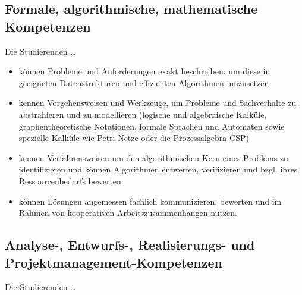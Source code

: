 \subsection{Formale, algorithmische, mathematische
Kompetenzen}\label{formale-algorithmische-mathematische-kompetenzen}

Die Studierenden \ldots{}

\begin{itemize}
\tightlist
\item
  können Probleme und Anforderungen exakt beschreiben, um diese in
  geeigneten Datenstrukturen und effizienten Algorithmen umzusetzen.
\item
  kennen Vorgehensweisen und Werkzeuge, um Probleme und Sachverhalte zu
  abstrahieren und zu modellieren (logische und algebraische Kalküle,
  graphentheoretische Notationen, formale Sprachen und Automaten sowie
  spezielle Kalküle wie Petri-Netze oder die Prozessalgebra CSP)
\item
  kennen Verfahrensweisen um den algorithmischen Kern eines Problems zu
  identifizieren und können Algorithmen entwerfen, verifizieren und
  bzgl. ihres Ressourcenbedarfs bewerten.
\item
  können Lösungen angemessen fachlich kommunizieren, bewerten und im
  Rahmen von kooperativen Arbeitszusammenhängen nutzen.
\end{itemize}

\subsection{Analyse-, Entwurfs-, Realisierungs- und
Projektmanagement-Kompetenzen}\label{analyse--entwurfs--realisierungs--und-projektmanagement-kompetenzen}

Die Studierenden \ldots{}

